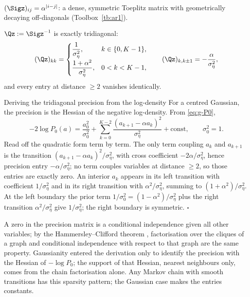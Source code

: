 \begin{proposition}\label{prop:g-Sigma0}
$(\Sigz)_{ij} = \alpha^{|i-j|}$: a dense, symmetric Toeplitz matrix with
geometrically decaying off-diagonals (Toolbox~\ref{tb:ar1}).
\end{proposition}

\begin{proposition}\label{prop:g-Q0}
$\Qz := \Sigz^{-1}$ is exactly tridiagonal:
\begin{equation}
  (\Qz)_{kk} =
  \begin{cases}
    \dfrac{1}{\sigma_\eta^2}, & k \in \{0, K-1\},\\[8pt]
    \dfrac{1+\alpha^2}{\sigma_\eta^2}, & 0 < k < K-1,
  \end{cases}
  \qquad
  (\Qz)_{k, k\pm 1} = -\frac{\alpha}{\sigma_\eta^2},
  \label{eq:g-Q0}
\end{equation}
and every entry at distance $\geq 2$ vanishes identically.
\end{proposition}

\begin{toolbox}{Deriving the tridiagonal precision from the log-density}
For a centred Gaussian, the precision is the Hessian of the negative
log-density. From \eqref{eq:g-P0},
\begin{equation*}
  -2 \log P_0(a)
  = \frac{a_0^2}{\sigma_0^2}
  + \sum_{k=0}^{K-2} \frac{(a_{k+1} - \alpha a_k)^2}{\sigma_\eta^2}
  + \text{const},
  \qquad \sigma_0^2 = 1 .
\end{equation*}
Read off the quadratic form term by term. The only term coupling $a_k$ and
$a_{k+1}$ is the transition $(a_{k+1} - \alpha a_k)^2/\sigma_\eta^2$, with
cross coefficient $-2\alpha/\sigma_\eta^2$, hence precision entry
$-\alpha/\sigma_\eta^2$; no term couples variables at distance $\geq 2$,
so those entries are exactly zero. An interior $a_k$ appears in its left
transition with coefficient $1/\sigma_\eta^2$ and in its right transition
with $\alpha^2/\sigma_\eta^2$, summing to $(1+\alpha^2)/\sigma_\eta^2$. At
the left boundary the prior term $1/\sigma_0^2 = (1-\alpha^2)/\sigma_\eta^2$
plus the right transition $\alpha^2/\sigma_\eta^2$ give $1/\sigma_\eta^2$;
the right boundary is symmetric. \hfill$\square$
\end{toolbox}

\begin{remark}
\label{rmk:g-markov-sparsity}
A zero in the precision matrix is a conditional independence given all
other variables; by the Hammersley--Clifford theorem
\citep{besag1974spatial}, factorisation over the cliques of a graph and
conditional independence with respect to that graph are the same property.
Gaussianity entered the derivation only to identify the precision with the
Hessian of $-\log P_0$; the support of that Hessian, nearest neighbours
only, comes from the chain factorisation alone. Any Markov chain with
smooth transitions has this sparsity pattern; the Gaussian case makes the
entries constants.
\end{remark}

